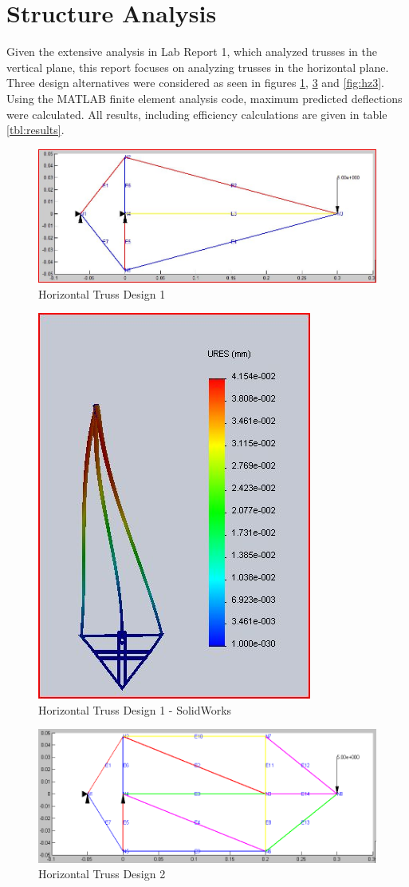 \section{Structure Analysis}
\label{sec:3analysis}

Given the extensive analysis in Lab Report 1, which analyzed trusses in the vertical plane, this report focuses on analyzing trusses in the horizontal plane.
Three design alternatives were considered as seen in figures \ref{fig:hz1}, \ref{fig:hz2} and \ref{fig:hz3}.
Using the MATLAB finite element analysis code, maximum predicted deflections were calculated.
All results, including efficiency calculations are given in table \ref{tbl:results}.

\begin{figure}[p]
    \centering
    \includegraphics[width=.8\textwidth]{images/horz_truss1}
    \caption{Horizontal Truss Design 1}
    \label{fig:hz1}
\end{figure}

\begin{figure}[p]
    \centering
    \includegraphics[width=.40\textwidth]{images/horiz_truss1_SW}
    \caption{Horizontal Truss Design 1 - SolidWorks}
    \label{fig:hz1_sw}
\end{figure}

\begin{figure}[p]
    \centering
    \includegraphics[width=.8\textwidth]{images/horizontal2}
    \caption{Horizontal Truss Design 2}
    \label{fig:hz2}
\end{figure}

